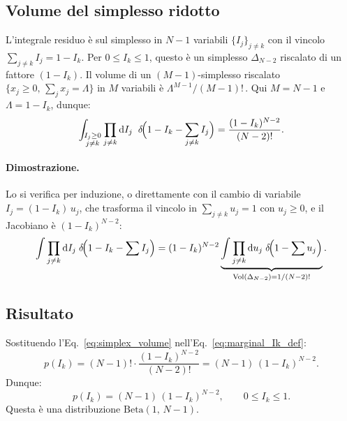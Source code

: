 \documentclass[a4paper,11pt]{article}
\newcommand{\de}{\mathrm{d}}
\begin{document}
\subsection{Volume del simplesso ridotto}

L'integrale residuo è sul simplesso in $N-1$ variabili
$\{I_j\}_{j \neq k}$ con il vincolo
$\sum_{j \neq k} I_j = 1 - I_k$.
Per $0 \leq I_k \leq 1$, questo è un simplesso $\Delta_{N-2}$ riscalato
di un fattore $(1 - I_k)$.
Il volume di un $(M{-}1)$-simplesso riscalato $\{x_j \geq 0,\,
\sum_j x_j = \Lambda\}$ in $M$ variabili è $\Lambda^{M-1}/(M-1)!$\,.
Qui $M = N - 1$ e $\Lambda = 1 - I_k$, dunque:
\begin{equation}\label{eq:simplex_volume}
  \int_{\substack{I_j \geq 0 \\ j \neq k}}
  \prod_{j \neq k} \de I_j \;\;
  \delta\!\Bigl(1 - I_k - \sum_{j\neq k} I_j\Bigr)
  = \frac{(1 - I_k)^{N-2}}{(N-2)!} .
\end{equation}

\paragraph{Dimostrazione.}
Lo si verifica per induzione, o direttamente con il cambio di variabile
$I_j = (1 - I_k)\,u_j$, che trasforma il vincolo in
$\sum_{j \neq k} u_j = 1$ con $u_j \geq 0$, e il Jacobiano è
$(1-I_k)^{N-2}$:
\begin{equation}
  \int \prod_{j \neq k} \de I_j \;\delta\!\Bigl(1 - I_k - \sum I_j\Bigr)
  = (1-I_k)^{N-2}
    \underbrace{\int \prod_{j \neq k} \de u_j \;\delta\!\Bigl(1 - \sum u_j\Bigr)}
    _{\mathrm{Vol}(\Delta_{N-2}) = 1/(N-2)!} .
\end{equation}

\subsection{Risultato}

Sostituendo l'Eq.~\eqref{eq:simplex_volume}
nell'Eq.~\eqref{eq:marginal_Ik_def}:
\begin{equation}
  p(I_k)
  = (N-1)! \cdot \frac{(1 - I_k)^{N-2}}{(N-2)!}
  = (N-1)\,(1 - I_k)^{N-2} .
\end{equation}
Dunque:
\begin{equation}\label{eq:marginal_Ik}
  \boxed{
  p(I_k) = (N-1)\,(1 - I_k)^{N-2} ,
  \qquad 0 \leq I_k \leq 1 .
  }
\end{equation}
Questa è una distribuzione $\mathrm{Beta}(1,\, N-1)$.
\end{document}
